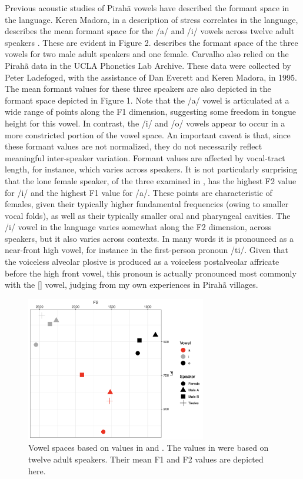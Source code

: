 \documentclass[output=paper,colorlinks,citecolor=brown
]{langscibook}
\begin{document}
    Previous acoustic studies of Pirahã vowels have described the formant space in the language. Keren Madora, in a description of stress correlates in the language, describes the mean formant space for the /a/ and /i/ vowels across twelve adult speakers \citep{everett1998acoustic}. These are evident in Figure 2. \citet{de2010vowel} describes the formant space of the three vowels for two male adult speakers and one female. Carvalho also relied on the Pirahã data in the UCLA Phonetics Lab Archive. These data were collected by Peter Ladefoged, with the assistance of Dan Everett and Keren Madora, in 1995. The mean formant values for these three speakers are also depicted in the formant space depicted in Figure 1. Note that the /a/ vowel is articulated at a wide range of points along the F1 dimension, suggesting some freedom in tongue height for this vowel. In contrast, the /i/ and /o/ vowels appear to occur in a more constricted portion of the vowel space. An important caveat is that, since these formant values are not normalized, they do not necessarily reflect meaningful inter-speaker variation. Formant values are affected by vocal-tract length, for instance, which varies across speakers. It is not particularly surprising that the lone female speaker, of the three examined in , has the highest F2 value for /i/ and the highest F1 value for /a/. These points are characteristic of females, given their typically higher fundamental frequencies (owing to smaller vocal folds), as well as their typically smaller oral and pharyngeal cavities. The /i/ vowel in the language varies somewhat along the F2 dimension, across speakers, but it also varies across contexts. In many words it is pronounced as a near-front high vowel, for instance in the first-person pronoun /ti/. Given that the voiceless alveolar plosive is produced as a voiceless postalveolar affricate before the high front vowel, this pronoun is actually pronounced most commonly with the [{\textsci}] vowel, judging from my own experiences in Pirahã villages.
    
\begin{figure}
\centering
\includegraphics[width=0.7\textwidth]{figures/everett_figure2.png}
\caption{\label{fig:Figure 2}Vowel spaces based on values in  and . The values in  were based on twelve adult speakers. Their mean F1 and F2 values are depicted here.}
\end{figure}
\end{document}
